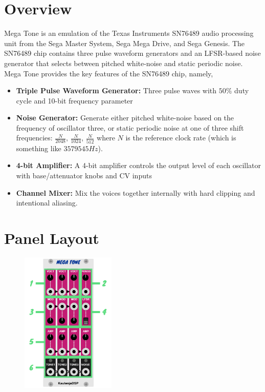 \documentclass[12pt,letter]{article}
\begin{document}


\section*{Overview}

Mega Tone is an emulation of the Texas Instruments SN76489 audio processing unit from the Sega Master System, Sega Mega Drive, and Sega Genesis. The SN76489 chip contains three pulse waveform generators and an LFSR-based noise generator that selects between pitched white-noise and static periodic noise. Mega Tone provides the key features of the SN76489 chip, namely,
\begin{itemize}
  \item \textbf{Triple Pulse Waveform Generator:} Three pulse waves with $50\%$ duty cycle and 10-bit frequency parameter
  \item \textbf{Noise Generator:} Generate either pitched white-noise based on the frequency of oscillator three, or static periodic noise at one of three shift frequencies: $\frac{N}{2048}$, $\frac{N}{1024}$, $\frac{N}{512}$ where $N$ is the reference clock rate (which is something like $3579545Hz$).
  \item \textbf{4-bit Amplifier:} A 4-bit amplifier controls the output level of each oscillator with base/attenuator knobs and CV inputs
  \item \textbf{Channel Mixer:} Mix the voices together internally with hard clipping and intentional aliasing.
\end{itemize}


\clearpage
\section*{Panel Layout}

\begin{figure}[!htp]
\centering
\includegraphics[width=0.4\textwidth]{Interface}
\end{figure}
\end{document}
